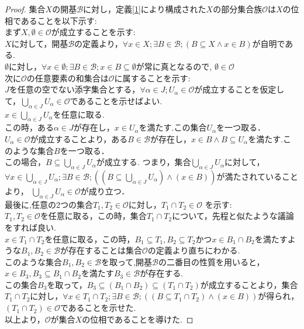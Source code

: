 \documentclass[lualatex]{ltjsbook}
\theoremstyle{remark}
\theoremstyle{plain}
\begin{document}
\begin{proof}
	集合$X$の開基$\mathcal{B}$に対し，定義\ref{1}により構成された$X$の部分集合族$\mathcal{O}$は$X$の位相であることを以下示す:\\
	まず$X, \emptyset \in \mathcal{O} $が成立することを示す:\\
	$ X$に対して，開基$\mathcal{B}$の定義より，$\forall x \in X  ; \exists B \in \mathcal{B} ; \left( B  \subseteq X \land x \in B \right)$が自明である.\\
	$\emptyset $に対し，$\forall x \in \emptyset ; \exists B \in \mathcal{B} ; x \in B \subseteq \emptyset$が常に真となるので, $\emptyset \in \mathcal{O}$\\
	次に$\mathcal{O}$の任意要素の和集合は$\mathcal{O}$に属することを示す:\\
	$J$を任意の空でない添字集合とする，$\forall \alpha \in J; U_{\alpha} \in \mathcal{O}$が成立することを仮定して，$\bigcup\limits_{\alpha \in J} U_{\alpha } \in \mathcal{O}$であることを示せばよい.\\
	$x \in \bigcup\limits_{\alpha \in J} U_{\alpha }$を任意に取る.\\
	この時，ある$\alpha \in J$が存在し，$x \in U_{\alpha}$を満たす.この集合$U_{\alpha}$を一つ取る．\\
	$U_{\alpha } \in \mathcal{O}$が成立することより，ある$B \in \mathcal{B}$が存在し，$x \in B \land B \subseteq U_{\alpha}$を満たす.このような集合$B$を一つ取る．\\
	この場合，$B \subseteq \bigcup\limits_{\alpha \in J} U_{\alpha } $が成立する.
	つまり，集合$\bigcup\limits_{\alpha \in J} U_{\alpha } $に対して，$\forall x \in \bigcup\limits_{\alpha \in J} U_{\alpha } ; \exists B \in \mathcal{B} ; \left( \left( B  \subseteq \bigcup\limits_{\alpha \in J} U_{\alpha } \right)  \land \left( x \in B \right) \right) $が満たされていることより，
	$\bigcup\limits_{\alpha \in J} U_{\alpha } \in \mathcal{O}$が成り立つ．\\
	最後に,任意の2つの集合$T_1 , T_2 \in \mathcal{O}$に対し，$T_1 \cap T_2 \in \mathcal{O}$ を示す:\\
	$T_1 , T_2 \in \mathcal{O}$を任意に取る，この時，集合$T_1 \cap T_2$について，先程と似たような議論をすれば良い.\\
	$x \in T_1 \cap T_2 $を任意に取る，この時，$B_1 \subseteq T_1, B_2 \subseteq T_2$かつ$x \in B_1 \cap B_2$を満たすような$B_1,B_2 \in \mathcal{B}$が存在することは集合$\mathcal{O}$の定義より直ちにわかる.\\
	このような集合$B_1, B_2 \in \mathcal{B}$を取って,開基$\mathcal{B}$の二番目の性質を用いると，$x \in B_3 ,B_3 \subseteq B_1 \cap B_2 $を満たす$B_3 \in \mathcal{B}$が存在する.\\
	この集合$B_3$を取って，$B_3 \subseteq \left( B_1 \cap B_2  \right) \subseteq \left( T_1 \cap T_2 \right) $が成立することより，集合$T_1 \cap T_2 $に対し，$\forall x \in T_1 \cap T_2 ; \exists B \in \mathcal{B} ; \left( \left( B  \subseteq T_1  \cap T_2 \right) \land \left( x \in B \right) \right) $が得られ，$\left( T_1 \cap T_2 \right) \in \mathcal{O}$であることを示せた.\\
	以上より，$\mathcal{O}$が集合$X$の位相であることを導けた.
\end{proof}
\end{document}
